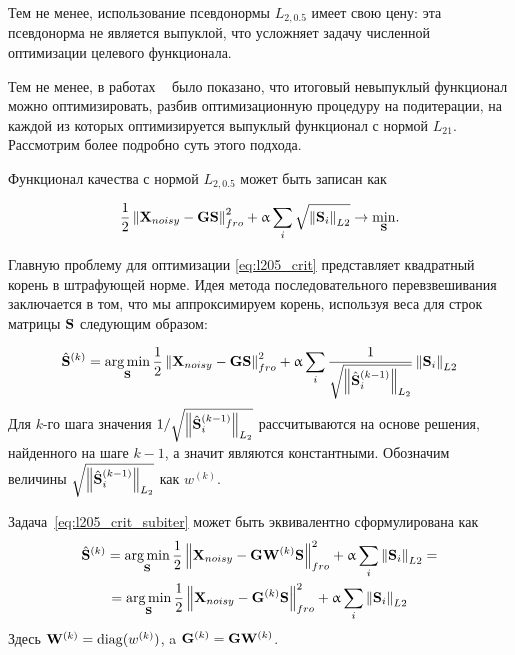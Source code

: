 Тем не менее, использование псевдонормы $L_{2, 0.5}$ имеет свою цену: эта псевдонорма
не является выпуклой, что усложняет задачу численной оптимизации целевого функционала.

Тем не менее, в работах ~\cite{8, 9, 13 from gramfort_2014} было показано, что
итоговый невыпуклый функционал можно оптимизировать, разбив оптимизационную
процедуру на подитерации, на каждой из которых оптимизируется выпуклый
функционал с нормой $L_{21}$. Рассмотрим более подробно суть этого подхода.


Функционал качества с нормой $L_{2, 0.5}$ может быть записан как

\begin{equation}
    \frac{1}{2}\left\lVert\mathbf{X}_{noisy} - \mathbf{G}\mathbf{S}\right\rVert^2_{fro} + \upalpha \sum_i{\sqrt{\left\lVert\mathbf{S}_i\right\rVert_{L2}}}
    \rightarrow \underset{\mathbf{S}}{\min}.
    \label{eq:l205_crit}
\end{equation}

Главную проблему для оптимизации \ref{eq:l205_crit} представляет квадратный
корень в штрафующей норме. Идея метода последовательного перевзвешивания
заключается в том, что мы аппроксимируем корень, используя веса для строк матрицы
$\mathbf{S}$ следующим образом:

\begin{equation}
    \hat{\mathbf{S}}^{(k)} = \operatorname*{arg\,min}_{\mathbf{S}} \frac{1}{2}\left\lVert\mathbf{X}_{noisy}
    - \mathbf{G}\mathbf{S}\right\rVert^2_{fro} + \upalpha
    \sum_i{\frac{1}{\sqrt{\left\lVert\hat{\mathbf{S}}_i^{(k-1)}\right\rVert_{L_2}}}\left\lVert\mathbf{S}_i\right\rVert_{L2}}
\label{eq:l205_crit_subiter}
\end{equation}
Для $k$-го шага значения $1/\sqrt{\left\lVert\hat{\mathbf{S}}_i^{(k-1)}\right\rVert_{L_2}}$ рассчитываются
на основе решения, найденного на шаге $k-1$, а значит являются константными. Обозначим
величины $\sqrt{\left\lVert\hat{\mathbf{S}}_i^{(k-1)}\right\rVert_{L_2}}$ как $w^{(k)}$.

Задача~\ref{eq:l205_crit_subiter} может быть эквивалентно сформулирована как
\begin{multline}
    \hat{\mathbf{S}}^{(k)} = \operatorname*{arg\,min}_{\mathbf{S}} \frac{1}{2}\left\lVert\mathbf{X}_{noisy}
    - \mathbf{G}\mathbf{W}^{(k)}\mathbf{S}\right\rVert^2_{fro} + \upalpha
    \sum_i{\left\lVert\mathbf{S}_i\right\rVert_{L2}} = \\
    = \operatorname*{arg\,min}_{\mathbf{S}} \frac{1}{2}\left\lVert\mathbf{X}_{noisy}
    - \mathbf{G}^{(k)}\mathbf{S}\right\rVert^2_{fro} + \upalpha
    \sum_i{\left\lVert\mathbf{S}_i\right\rVert_{L2}}
\label{eq:l205_crit_subiter_Wk}
\end{multline}
Здесь $\mathbf{W}^{(k)} = \operatorname{diag}(w^{(k)})$, a $\mathbf{G}^{(k)} = \mathbf{G} \mathbf{W}^{(k)}$.

